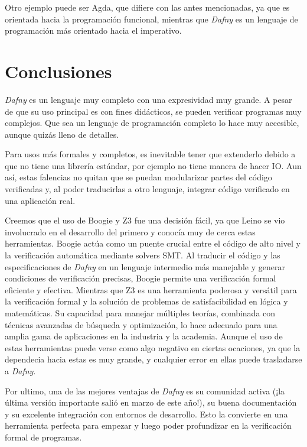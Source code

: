 \documentclass[runningheads]{llncs}
\begin{document}
Otro ejemplo puede ser Agda, que difiere con las antes mencionadas, ya que 
es orientada hacia la programación funcional, mientras que \textit{Dafny} es un lenguaje de programación más orientado hacia el imperativo. 
 
\section{Conclusiones}

\textit{Dafny} es un lenguaje muy completo con una expresividad muy grande. A pesar de que su uso principal es con fines didácticos, se pueden verificar programas muy complejos. 
Que sea un lenguaje de programación completo lo hace muy accesible, aunque quizás lleno de detalles.

Para usos más formales y completos, es inevitable tener que extenderlo debido a que no tiene una librería estándar, por ejemplo no tiene manera de hacer IO.
Aun así, estas falencias no quitan que se puedan modularizar partes del código verificadas y, al poder traducirlas a otro lenguaje, integrar código verificado en una aplicación real.

Creemos que el uso de Boogie y Z3 fue una decisión fácil, ya que Leino se vio involucrado en el desarrollo del primero y conocía muy de cerca estas herramientas.
Boogie actúa como un puente crucial entre el código de alto nivel y la verificación automática mediante solvers SMT. 
Al traducir el código y las especificaciones de \textit{Dafny} en un lenguaje intermedio más manejable y generar condiciones de verificación precisas, 
Boogie permite una verificación formal eficiente y efectiva.
Mientras que Z3 es una herramienta poderosa y versátil para la verificación formal y la solución de problemas de satisfacibilidad en lógica y matemáticas. 
Su capacidad para manejar múltiples teorías, combinada con técnicas avanzadas de búsqueda y optimización, 
lo hace adecuado para una amplia gama de aplicaciones en la industria y la academia.
Aunque el uso de estas herramientas puede verse como algo negativo en ciertas ocaciones, ya que la dependecia hacia estas es muy grande, y cualquier error en ellas puede trasladarse a \textit{Dafny}.

Por ultimo, una de las mejores ventajas de \textit{Dafny} es su comunidad activa (¡la última versión importante salió en marzo de este año!), 
su buena documentación y su excelente integración con entornos de desarrollo. Esto la convierte en una herramienta perfecta para empezar 
y luego poder profundizar en la verificación formal de programas.



\end{document}
